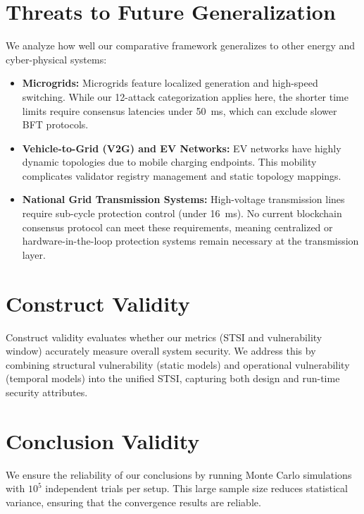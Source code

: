 \documentclass[12pt, oneside, a4paper]{report}
\theoremstyle{definition}
\theoremstyle{remark}
\begin{document}
\section{Threats to Future Generalization}
\label{sec:tv:generalization}
We analyze how well our comparative framework generalizes to other energy and cyber-physical systems:
\begin{itemize}
  \item \textbf{Microgrids:} Microgrids feature localized generation and high-speed switching. While our 12-attack categorization applies here, the shorter time limits require consensus latencies under 50~ms, which can exclude slower BFT protocols.
  \item \textbf{Vehicle-to-Grid (V2G) and EV Networks:} EV networks have highly dynamic topologies due to mobile charging endpoints. This mobility complicates validator registry management and static topology mappings.
  \item \textbf{National Grid Transmission Systems:} High-voltage transmission lines require sub-cycle protection control (under 16~ms). No current blockchain consensus protocol can meet these requirements, meaning centralized or hardware-in-the-loop protection systems remain necessary at the transmission layer.
\end{itemize}

\section{Construct Validity}
\label{sec:tv:construct}
Construct validity evaluates whether our metrics (STSI and vulnerability window) accurately measure overall system security. We address this by combining structural vulnerability (static models) and operational vulnerability (temporal models) into the unified STSI, capturing both design and run-time security attributes.

\section{Conclusion Validity}
\label{sec:tv:conclusion}
We ensure the reliability of our conclusions by running Monte Carlo simulations with $10^5$ independent trials per setup. This large sample size reduces statistical variance, ensuring that the convergence results are reliable.
\end{document}
